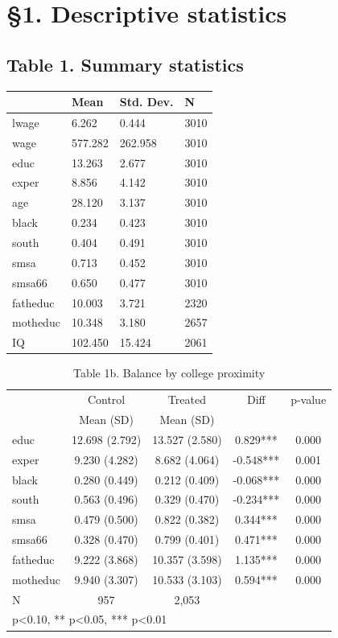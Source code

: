 \section{§1. Descriptive statistics}

\subsection*{Table 1. Summary statistics}
\begin{tabular}{llll}
\toprule
 & Mean & Std. Dev. & N \\
\midrule
lwage & 6.262 & 0.444 & 3010 \\
wage & 577.282 & 262.958 & 3010 \\
educ & 13.263 & 2.677 & 3010 \\
exper & 8.856 & 4.142 & 3010 \\
age & 28.120 & 3.137 & 3010 \\
black & 0.234 & 0.423 & 3010 \\
south & 0.404 & 0.491 & 3010 \\
smsa & 0.713 & 0.452 & 3010 \\
smsa66 & 0.650 & 0.477 & 3010 \\
fatheduc & 10.003 & 3.721 & 2320 \\
motheduc & 10.348 & 3.180 & 2657 \\
IQ & 102.450 & 15.424 & 2061 \\
\bottomrule
\end{tabular}


\begin{table}[htbp]
\centering
\caption{Table 1b. Balance by college proximity}
\begin{tabular}{lcccc}
\hline\hline
 & Control & Treated & Diff & p-value \\
 & Mean (SD) & Mean (SD) & & \\
\hline
educ & 12.698 (2.792) & 13.527 (2.580) & 0.829*** & 0.000 \\
exper & 9.230 (4.282) & 8.682 (4.064) & -0.548*** & 0.001 \\
black & 0.280 (0.449) & 0.212 (0.409) & -0.068*** & 0.000 \\
south & 0.563 (0.496) & 0.329 (0.470) & -0.234*** & 0.000 \\
smsa & 0.479 (0.500) & 0.822 (0.382) & 0.344*** & 0.000 \\
smsa66 & 0.328 (0.470) & 0.799 (0.401) & 0.471*** & 0.000 \\
fatheduc & 9.222 (3.868) & 10.357 (3.598) & 1.135*** & 0.000 \\
motheduc & 9.940 (3.307) & 10.533 (3.103) & 0.594*** & 0.000 \\
\hline
N & 957 & 2,053 & & \\
\hline\hline
\multicolumn{5}{l}{\footnotesize * p<0.10, ** p<0.05, *** p<0.01} \\
\end{tabular}
\end{table}

